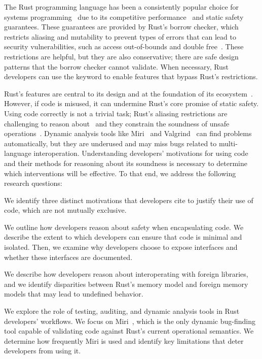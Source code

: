 The Rust programming language has been a consistently popular choice for systems programming~\cite{stackoverflow_dev_survey23} due to its competitive performance~\cite{pereira17} and static safety guarantees. These guarantees are provided by Rust's borrow checker, which restricts aliasing and mutability to prevent types of errors that can lead to security vulnerabilities, such as access out-of-bounds and double free~\cite{qin20}. These restrictions are helpful, but they are also conservative; there are safe design patterns that the borrow checker cannot validate. When necessary, Rust developers can use the \unsafe keyword to enable features that bypass Rust's restrictions. 

Rust's \unsafe features are central to its design and at the foundation of its ecosystem~\cite{astrauskas20,evans20}.  However, if \unsafe code is misused, it can undermine Rust's core promise of static safety. Using \unsafe code correctly is not a trivial task; Rust's aliasing restrictions are challenging to reason about~\cite{zhu22} and they constrain the soundness of unsafe operations~\cite{stacked_borrows}. Dynamic analysis tools like Miri~\cite{miri} and Valgrind~\cite{seward07} can find problems automatically, but they are underused and may miss bugs related to multi-language interoperation. Understanding developers' motivations for using \unsafe code and their methods for reasoning about its soundness is necessary to determine which interventions will be effective. To that end, we address the following research questions:

\rsqone We identify three distinct motivations that developers cite to justify their use of \unsafe code, which are not mutually exclusive.

\rsqtwo We outline how developers reason about safety when encapsulating \unsafe code. We describe the extent to which developers can ensure that \unsafe code is minimal and isolated. Then, we examine why developers choose to expose \unsafe interfaces and whether these interfaces are documented.

\rsqthree 
We describe how developers reason about interoperating with foreign libraries, and we identify disparities between Rust's memory model and foreign memory models that may lead to undefined behavior.  

\rsqfour We explore the role of testing, auditing, and dynamic analysis tools in Rust developers' workflows. We focus on Miri~\cite{miri}, which is the only dynamic bug-finding tool capable of validating \unsafe code against Rust's current operational semantics. We determine how frequently Miri is used and identify key limitations that deter developers from using it. 

